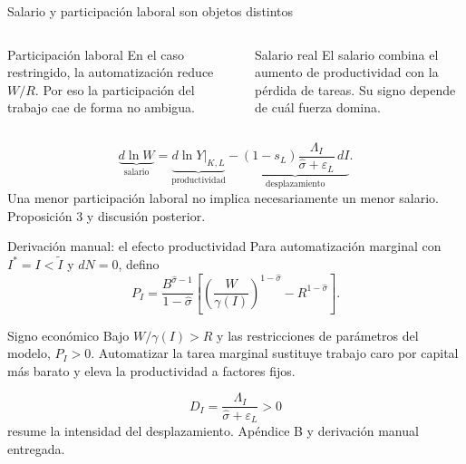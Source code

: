 \documentclass[aspectratio=169,11pt]{beamer}
\newcommand{\source}[1]{\vfill\hfill{\tiny\color{gray}#1}}
\begin{document}
\begin{frame}{Salario y participación laboral son objetos distintos}
  \begin{columns}[T,onlytextwidth]
      \begin{block}{Participación laboral}
        En el caso restringido, la automatización reduce $W/R$.
        Por eso la participación del trabajo cae de forma no ambigua.
      \end{block}
      \begin{block}{Salario real}
        El salario combina el aumento de productividad con la pérdida de tareas.
        Su signo depende de cuál fuerza domina.
      \end{block}
  \end{columns}
  \vspace{0.55cm}
  \[
    \underbrace{d\ln W}_{\text{salario}}
    =\underbrace{d\ln Y\vert_{K,L}}_{\text{productividad}}
    -\underbrace{(1-s_L)\frac{\Lambda_I}{\widehat\sigma+\varepsilon_L}\,dI}_{\text{desplazamiento}}.
  \]
  \centering
  \large Una menor participación laboral no implica necesariamente un menor salario.
  \source{Proposición 3 y discusión posterior.}
\end{frame}

\begin{frame}{Derivación manual: el efecto productividad}
  Para automatización marginal con $I^{*}=I<\widetilde I$ y $dN=0$, defino
  \[
    P_I=\frac{B^{\widehat\sigma-1}}{1-\widehat\sigma}
    \left[
      \left(\frac{W}{\gamma(I)}\right)^{1-\widehat\sigma}
      -R^{1-\widehat\sigma}
    \right].
  \]
  \begin{block}{Signo económico}
    Bajo $W/\gamma(I)>R$ y las restricciones de parámetros del modelo,
    $P_I>0$. Automatizar la tarea marginal sustituye trabajo caro por capital
    más barato y eleva la productividad a factores fijos.
  \end{block}
  \vspace{0.25cm}
  \[
    D_I=\frac{\Lambda_I}{\widehat\sigma+\varepsilon_L}>0
  \]
  resume la intensidad del desplazamiento.
  \source{Apéndice B y derivación manual entregada.}
\end{frame}
\end{document}
